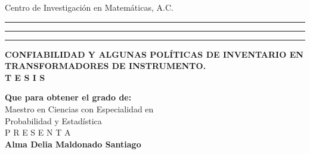 \documentclass[letterpaper, titlepage,openright, oneside,11pt]{book}
\begin{document}
\begin{minipage}[c][11cm][s]{13.4cm}
\vspace{8mm} \LARGE Centro de Investigaci\'on en Matem\'aticas,
A.C. \\    \begin{center}
     \vspace{.1cm}  %

        \hrule height1pt

        \vspace{.1cm}

        \hrule height2pt

        \vspace{.1cm}

        \hrule height1pt

        \vspace{2.2cm}





       {
     \vspace{-3mm} \LARGE  \textbf{CONFIABILIDAD Y ALGUNAS POL\'ITICAS DE INVENTARIO EN TRANSFORMADORES DE INSTRUMENTO. }\\

\vspace{8mm} \LARGE \textbf{T E S I S }\\

      }


      { \vspace{5mm}\LARGE

                       \textbf{Que para obtener el grado de:}\\

            \vspace{5mm}      {Maestro en Ciencias con Especialidad en}\\

                       {Probabilidad y Estad\'istica}\\

     \vspace{13mm}           P  R  E  S  E  N  T  A \\

     \vspace{5mm}     \textbf{Alma Delia Maldonado Santiago}\\

}
\end{center}
\end{minipage}
\end{document}
